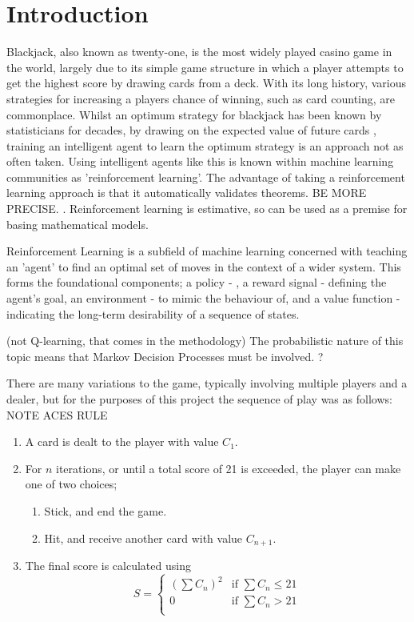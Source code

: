 \section{Introduction}

Blackjack, also known as twenty-one, is the most widely played casino game in the world, largely due to its simple game structure in which a player attempts to get the highest score by drawing cards from a deck. With its long history, various strategies for increasing a players chance of winning, such as card counting, are commonplace. Whilst an optimum strategy for blackjack has been known by statisticians for decades, by drawing on the expected value of future cards \cite{Baldwin01091956}, training an intelligent agent to learn the optimum strategy is an approach not as often taken. Using intelligent agents like this is known within machine learning communities as 'reinforcement learning'. The advantage of taking a reinforcement learning approach is that it automatically validates theorems. BE MORE PRECISE.  \cite{bidi2023reinforcementlearningcontroltheory}. Reinforcement learning is estimative, so can be used as a premise for basing mathematical models. 

Reinforcement Learning is a subfield of machine learning concerned with teaching an 'agent' to find an optimal set of moves in the context of a wider system. This forms the foundational components; a policy - , a reward signal - defining the agent's goal, an environment - to mimic the behaviour of, and a value function - indicating the long-term desirability of a sequence of states.

 (not Q-learning, that comes in the methodology)
\cite{10.5555/3312046}
The probabilistic nature of this topic means that Markov Decision Processes must be involved. ?

There are many variations to the game, typically involving multiple players and a dealer, but for the purposes of this project the sequence of play was as follows: NOTE ACES RULE

\begin{enumerate}
    \item A card is dealt to the player with value \(C_1\).
    \item For \(n\) iterations, or until a total score of 21 is exceeded, the player can make one of two choices;
    \begin{enumerate} 
        \item Stick, and end the game.
        \item Hit, and receive another card with value \(C_{n+1}\).
    \end{enumerate}
    \item The final score is calculated using
        \begin{equation}
            S = 
            \begin{cases}
                (\sum C_n)^2 & \text{if } \sum C_n \le 21\\
                0            & \text{if } \sum C_n >   21\\
            \end{cases}
        \end{equation}
\end{enumerate}

